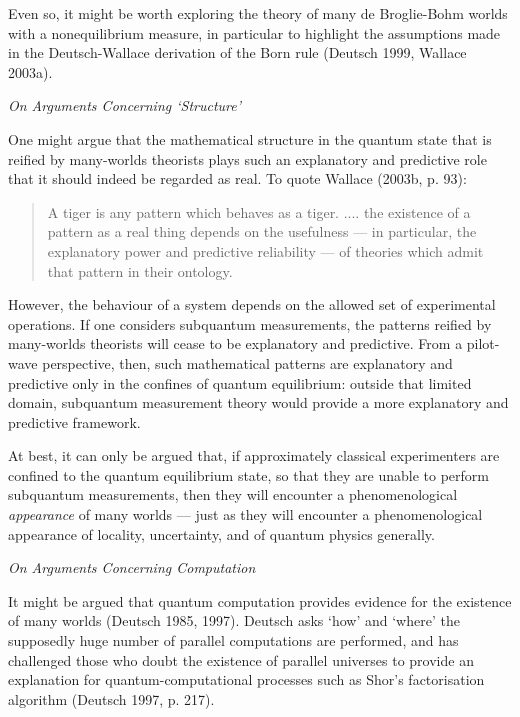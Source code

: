 \documentclass[12pt]{article}%
\begin{document}
Even so, it might be worth exploring the theory of many de Broglie-Bohm worlds
with a nonequilibrium measure, in particular to highlight the assumptions made
in the Deutsch-Wallace derivation of the Born rule (Deutsch 1999, Wallace 2003a).

\begin{center}
\textit{On Arguments Concerning `Structure'}
\end{center}

One might argue that the mathematical structure in the quantum state that is
reified by many-worlds theorists plays such an explanatory and predictive role
that it should indeed be regarded as real. To quote Wallace (2003b, p. 93):

\begin{quote}
A tiger is any pattern which behaves as a tiger. .... the existence of a
pattern as a real thing depends on the usefulness --- in particular, the
explanatory power and predictive reliability --- of theories which admit that
pattern in their ontology.
\end{quote}

However, the behaviour of a system depends on the allowed set of experimental
operations. If one considers subquantum measurements, the patterns reified by
many-worlds theorists will cease to be explanatory and predictive. From a
pilot-wave perspective, then, such mathematical patterns are explanatory and
predictive only in the confines of quantum equilibrium: outside that limited
domain, subquantum measurement theory would provide a more explanatory and
predictive framework.

At best, it can only be argued that, if approximately classical experimenters
are confined to the quantum equilibrium state, so that they are unable to
perform subquantum measurements, then they will encounter a phenomenological
\textit{appearance} of many worlds --- just as they will encounter a
phenomenological appearance of locality, uncertainty, and of quantum physics generally.

\begin{center}
\textit{On Arguments Concerning Computation}
\end{center}

It might be argued that quantum computation provides evidence for the
existence of many worlds (Deutsch 1985, 1997). Deutsch asks `how' and `where'
the supposedly huge number of parallel computations are performed, and has
challenged those who doubt the existence of parallel universes to provide an
explanation for quantum-computational processes such as Shor's factorisation
algorithm (Deutsch 1997, p. 217).
\end{document}

